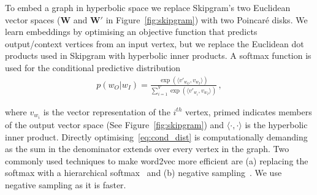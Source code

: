 \documentclass[sigconf, review]{acmart}
\begin{document}
To embed a graph in hyperbolic space we replace Skipgram's two Euclidean vector spaces ($\mathbf{W}$ and $\mathbf{W'}$ in Figure~\ref{fig:skipgram}) with two Poincar\'e disks. We learn embeddings by optimising an objective function that predicts output/context vertices from an input vertex, but we replace the Euclidean dot products used in Skipgram with hyperbolic inner products. A softmax function is used for the conditional predictive distribution
\begin{align}
p(w_O|w_I) = \frac{\exp (\langle v'_{w_O}, v_{w_I} \rangle)}{\sum_{i=1}^V\exp (\langle v'_{w_i}, v_{w_I} \rangle )}\,,
\label{eq:cond_dist}
\end{align}

where $v_{w_i}$ is the vector representation of the $i^{th}$ vertex, primed indicates members of the output vector space (See Figure~\ref{fig:skipgram}) and $\langle\cdot,\cdot \rangle$ is the hyperbolic inner product.
Directly optimising~\eqref{eq:cond_dist} is computationally demanding as the sum in the denominator extends over every vertex in the graph. Two commonly used techniques to make word2vec more efficient are (a) replacing the softmax with a hierarchical softmax~\cite{Mnih2008, Mikolov2013} and (b) negative sampling~\cite{Mnih2012, Mnih2013}. We use negative sampling as it is faster. 
\end{document}
